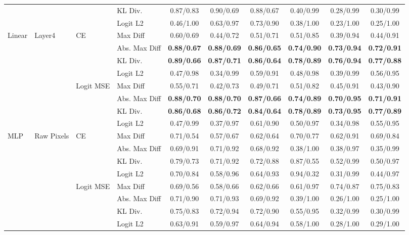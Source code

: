 \documentclass[border=2pt]{standalone}
\begin{document}
\begin{tabular}{llllcccccc}
 &  &  & KL Div. & 0.87/0.83 & 0.90/0.69 & 0.88/0.67 & 0.40/0.99 & 0.28/0.99 & 0.30/0.99 \\
 &  &  & Logit L2 & 0.46/1.00 & 0.63/0.97 & 0.73/0.90 & 0.38/1.00 & 0.23/1.00 & 0.25/1.00 \\
\midrule
Linear & Layer4 & CE & Max Diff & 0.60/0.69 & 0.44/0.72 & 0.51/0.71 & 0.51/0.85 & 0.39/0.94 & 0.44/0.91 \\
 &  &  & Abs. Max Diff & \textbf{0.88/0.67} & \textbf{0.88/0.69} & \textbf{0.86/0.65} & \textbf{0.74/0.90} & \textbf{0.73/0.94} & \textbf{0.72/0.91} \\
 &  &  & KL Div. & \textbf{0.89/0.66} & \textbf{0.87/0.71} & \textbf{0.86/0.64} & \textbf{0.78/0.89} & \textbf{0.76/0.94} & \textbf{0.77/0.88} \\
 &  &  & Logit L2 & 0.47/0.98 & 0.34/0.99 & 0.59/0.91 & 0.48/0.98 & 0.39/0.99 & 0.56/0.95 \\
\addlinespace
 &  & Logit MSE & Max Diff & 0.55/0.71 & 0.42/0.73 & 0.49/0.71 & 0.51/0.82 & 0.45/0.91 & 0.43/0.90 \\
 &  &  & Abs. Max Diff & \textbf{0.88/0.70} & \textbf{0.88/0.70} & \textbf{0.87/0.66} & \textbf{0.74/0.89} & \textbf{0.70/0.95} & \textbf{0.71/0.91} \\
 &  &  & KL Div. & \textbf{0.86/0.68} & \textbf{0.86/0.72} & \textbf{0.84/0.64} & \textbf{0.78/0.89} & \textbf{0.73/0.95} & \textbf{0.77/0.89} \\
 &  &  & Logit L2 & 0.47/0.99 & 0.37/0.97 & 0.61/0.90 & 0.50/0.97 & 0.34/0.98 & 0.55/0.95 \\
\midrule
MLP & Raw Pixels & CE & Max Diff & 0.71/0.54 & 0.57/0.67 & 0.62/0.64 & 0.70/0.77 & 0.62/0.91 & 0.69/0.84 \\
 &  &  & Abs. Max Diff & 0.69/0.91 & 0.71/0.92 & 0.68/0.92 & 0.38/1.00 & 0.38/0.97 & 0.35/0.99 \\
 &  &  & KL Div. & 0.79/0.73 & 0.71/0.92 & 0.72/0.88 & 0.87/0.55 & 0.52/0.99 & 0.50/0.97 \\
 &  &  & Logit L2 & 0.70/0.84 & 0.58/0.96 & 0.64/0.93 & 0.94/0.32 & 0.31/0.99 & 0.44/0.97 \\
\addlinespace
 &  & Logit MSE & Max Diff & 0.69/0.56 & 0.58/0.66 & 0.62/0.66 & 0.61/0.97 & 0.74/0.87 & 0.75/0.83 \\
 &  &  & Abs. Max Diff & 0.71/0.90 & 0.71/0.93 & 0.69/0.92 & 0.39/1.00 & 0.26/1.00 & 0.25/1.00 \\
 &  &  & KL Div. & 0.75/0.83 & 0.72/0.94 & 0.72/0.90 & 0.55/0.95 & 0.32/0.99 & 0.30/0.99 \\
 &  &  & Logit L2 & 0.63/0.91 & 0.59/0.97 & 0.64/0.94 & 0.58/1.00 & 0.28/1.00 & 0.29/1.00 \\

\end{tabular}
\end{document}

